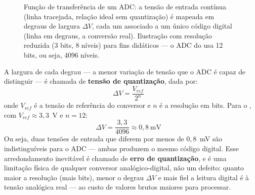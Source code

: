 \begin{figure}[h]
\centering
{}
\caption{Função de transferência de um ADC: a tensão de entrada contínua (linha tracejada, relação ideal sem quantização) é mapeada em degraus de largura $\Delta V$, cada um associado a um único código digital (linha em degraus, a conversão real). Ilustração com resolução reduzida (3 bits, 8 níveis) para fins didáticos — o ADC do \ESP{} usa 12 bits, ou seja, 4096 níveis.}
\label{fig:adc-staircase}
\end{figure}

A largura de cada degrau — a menor variação de tensão que o ADC é capaz de distinguir — é chamada de \textbf{tensão de quantização}, dada por:
\[
\Delta V = \frac{V_{ref}}{2^n}
\]
onde $V_{ref}$ é a tensão de referência do conversor e $n$ é a resolução em bits. Para o \ESP{}, com $V_{ref} \approx 3{,}3$~V e $n = 12$:
\[
\Delta V = \frac{3{,}3}{4096} \approx 0{,}8~\text{mV}
\]
Ou seja, duas tensões de entrada que diferem por menos de $0{,}8$~mV são indistinguíveis para o ADC — ambas produzem o mesmo código digital. Esse arredondamento inevitável é chamado de \textbf{erro de quantização}, e é uma limitação física de qualquer conversor analógico-digital, não um defeito: quanto maior a resolução (mais bits), menor o degrau $\Delta V$ e mais fiel a leitura digital é à tensão analógica real — ao custo de valores brutos maiores para processar.

